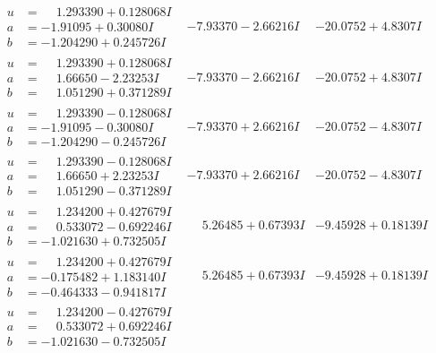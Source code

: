 \documentclass[1p]{elsarticle_modified}
\theoremstyle{definition}
\begin{document}
$$\begin{array}{c|c|c}
\begin{aligned}
u &= \phantom{-}1.293390 + 0.128068 I \\
a &= -1.91095 + 0.30080 I \\
b &= -1.204290 + 0.245726 I\end{aligned}
 & -7.93370 - 2.66216 I & -20.0752 + 4.8307 I \\ \hline\begin{aligned}
u &= \phantom{-}1.293390 + 0.128068 I \\
a &= \phantom{-}1.66650 - 2.23253 I \\
b &= \phantom{-}1.051290 + 0.371289 I\end{aligned}
 & -7.93370 - 2.66216 I & -20.0752 + 4.8307 I \\ \hline\begin{aligned}
u &= \phantom{-}1.293390 - 0.128068 I \\
a &= -1.91095 - 0.30080 I \\
b &= -1.204290 - 0.245726 I\end{aligned}
 & -7.93370 + 2.66216 I & -20.0752 - 4.8307 I \\ \hline\begin{aligned}
u &= \phantom{-}1.293390 - 0.128068 I \\
a &= \phantom{-}1.66650 + 2.23253 I \\
b &= \phantom{-}1.051290 - 0.371289 I\end{aligned}
 & -7.93370 + 2.66216 I & -20.0752 - 4.8307 I \\ \hline\begin{aligned}
u &= \phantom{-}1.234200 + 0.427679 I \\
a &= \phantom{-}0.533072 - 0.692246 I \\
b &= -1.021630 + 0.732505 I\end{aligned}
 & \phantom{-}5.26485 + 0.67393 I & -9.45928 + 0.18139 I \\ \hline\begin{aligned}
u &= \phantom{-}1.234200 + 0.427679 I \\
a &= -0.175482 + 1.183140 I \\
b &= -0.464333 - 0.941817 I\end{aligned}
 & \phantom{-}5.26485 + 0.67393 I & -9.45928 + 0.18139 I \\ \hline\begin{aligned}
u &= \phantom{-}1.234200 - 0.427679 I \\
a &= \phantom{-}0.533072 + 0.692246 I \\
b &= -1.021630 - 0.732505 I\end{aligned}

\end{array}$$
\end{document}
